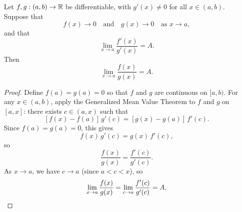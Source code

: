 \documentclass[../master/master.tex]{subfiles}
\begin{document}
\begin{theorem}
Let $f, g: (a,b) \to \mathbb{R}$ be differentiable, with $g'(x) \neq 0$ for all $x \in (a,b)$. Suppose that
\[
f(x) \to 0 \quad \text{and} \quad g(x) \to 0 \quad \text{as } x \to a,
\]
and that
\[
\lim_{x \to a} \frac{f'(x)}{g'(x)} = A.
\]
Then
\[
\lim_{x \to a} \frac{f(x)}{g(x)} = A.
\]
\end{theorem}

\begin{proof}
Define $f(a) = g(a) = 0$ so that $f$ and $g$ are continuous on $[a,b)$. For any $x \in (a,b)$, apply the Generalized Mean Value Theorem to $f$ and $g$ on $[a,x]$: there exists $c \in (a,x)$ such that
\[
[f(x) - f(a)]\, g'(c) = [g(x) - g(a)]\, f'(c).
\]
Since $f(a) = g(a) = 0$, this gives
\[
f(x)\, g'(c) = g(x)\, f'(c),
\]
so
\[
\frac{f(x)}{g(x)} = \frac{f'(c)}{g'(c)}.
\]
As $x \to a$, we have $c \to a$ (since $a < c < x$), so
\[
\lim_{x \to a} \frac{f(x)}{g(x)} = \lim_{c \to a} \frac{f'(c)}{g'(c)} = A. \qedhere
\]
\end{proof}
\end{document}
